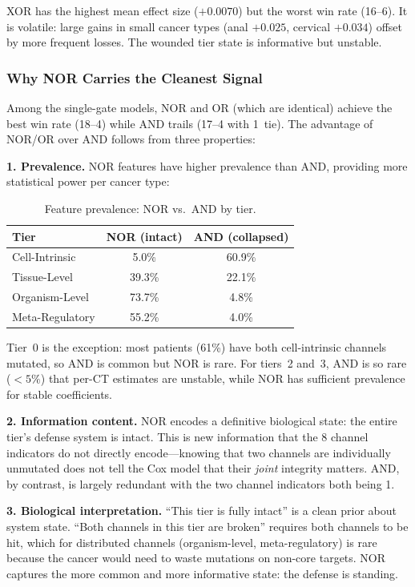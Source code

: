 \documentclass[11pt]{article}
\begin{document}
XOR has the highest mean effect size ($+0.0070$) but the worst
win rate (16--6). It is volatile: large gains in small cancer
types (anal $+0.025$, cervical $+0.034$) offset by more frequent
losses. The wounded tier state is informative but unstable.

\subsubsection{Why NOR Carries the Cleanest Signal}

Among the single-gate models, NOR and OR (which are identical)
achieve the best win rate (18--4) while AND trails (17--4 with
1~tie). The advantage of NOR/OR over AND follows from three
properties:

\textbf{1. Prevalence.} NOR features have higher prevalence than
AND, providing more statistical power per cancer type:

\begin{table}[ht]
\centering
\caption{Feature prevalence: NOR vs.\ AND by tier.}
\label{tab:prevalence}
\begin{tabular}{@{}lcc@{}}
\toprule
Tier & NOR (intact) & AND (collapsed) \\
\midrule
Cell-Intrinsic & 5.0\% & 60.9\% \\
Tissue-Level & 39.3\% & 22.1\% \\
Organism-Level & 73.7\% & 4.8\% \\
Meta-Regulatory & 55.2\% & 4.0\% \\
\bottomrule
\end{tabular}
\end{table}

Tier~0 is the exception: most patients (61\%) have both
cell-intrinsic channels mutated, so AND is common but NOR is
rare. For tiers~2 and~3, AND is so rare ($<5\%$) that per-CT
estimates are unstable, while NOR has sufficient prevalence for
stable coefficients.

\textbf{2. Information content.} NOR encodes a definitive
biological state: the entire tier's defense system is intact.
This is new information that the 8 channel indicators do not
directly encode---knowing that two channels are individually
unmutated does not tell the Cox model that their \emph{joint}
integrity matters. AND, by contrast, is largely redundant with
the two channel indicators both being 1.

\textbf{3. Biological interpretation.} ``This tier is fully
intact'' is a clean prior about system state. ``Both channels in
this tier are broken'' requires both channels to be hit, which
for distributed channels (organism-level, meta-regulatory) is
rare because the cancer would need to waste mutations on
non-core targets. NOR captures the more common and more
informative state: the defense is standing.
\end{document}
